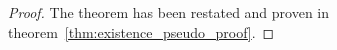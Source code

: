 \begin{theorem}
\end{theorem}

\begin{proof}
	The theorem has been restated and proven in theorem~\ref{thm:existence_pseudo_proof}.
\end{proof}
